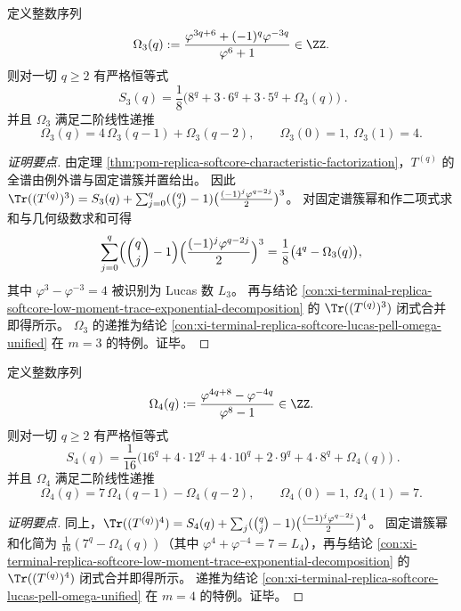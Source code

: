 \begin{conclusion}\label{con:xi-terminal-replica-softcore-exceptional-power-sum-m3}
定义整数序列
\[
\Omega_3(q):=\frac{\varphi^{3q+6}+(-1)^q\varphi^{-3q}}{\varphi^{6}+1}\in\ZZ.
\]
则对一切 \(q\ge 2\) 有严格恒等式
\[
\boxed{\;
S_3(q)=\frac18\Big(8^{q}+3\cdot 6^{q}+3\cdot 5^{q}+\Omega_3(q)\Big)\; }.
\]
并且 \(\Omega_3\) 满足二阶线性递推
\[
\Omega_3(q)=4\,\Omega_3(q-1)+\Omega_3(q-2),\qquad \Omega_3(0)=1,\ \Omega_3(1)=4.
\]
\end{conclusion}
\begin{proof}[证明要点]
由定理 \ref{thm:pom-replica-softcore-characteristic-factorization}，\(T^{(q)}\) 的全谱由例外谱与固定谱簇并置给出。
因此
\(
\Tr((T^{(q)})^3)=S_3(q)+\sum_{j=0}^{q}(\binom{q}{j}-1)\bigl(\frac{(-1)^j\varphi^{q-2j}}{2}\bigr)^3
\)。
对固定谱簇幂和作二项式求和与几何级数求和可得
\[
\sum_{j=0}^{q}\Bigl(\binom{q}{j}-1\Bigr)\Bigl(\frac{(-1)^j\varphi^{q-2j}}{2}\Bigr)^3
=\frac18\bigl(4^q-\Omega_3(q)\bigr),
\]
其中 \(\varphi^3-\varphi^{-3}=4\) 被识别为 Lucas 数 \(L_3\)。
再与结论 \ref{con:xi-terminal-replica-softcore-low-moment-trace-exponential-decomposition} 的 \(\Tr((T^{(q)})^3)\) 闭式合并即得所示。
\(\Omega_3\) 的递推为结论 \ref{con:xi-terminal-replica-softcore-lucas-pell-omega-unified} 在 \(m=3\) 的特例。证毕。
\end{proof}

\begin{conclusion}\label{con:xi-terminal-replica-softcore-exceptional-power-sum-m4}
定义整数序列
\[
\Omega_4(q):=\frac{\varphi^{4q+8}-\varphi^{-4q}}{\varphi^{8}-1}\in\ZZ.
\]
则对一切 \(q\ge 2\) 有严格恒等式
\[
\boxed{\;
S_4(q)=\frac1{16}\Big(16^{q}+4\cdot 12^{q}+4\cdot 10^{q}+2\cdot 9^{q}+4\cdot 8^{q}+\Omega_4(q)\Big)\; }.
\]
并且 \(\Omega_4\) 满足二阶线性递推
\[
\Omega_4(q)=7\,\Omega_4(q-1)-\Omega_4(q-2),\qquad \Omega_4(0)=1,\ \Omega_4(1)=7.
\]
\end{conclusion}
\begin{proof}[证明要点]
同上，\(
\Tr((T^{(q)})^4)=S_4(q)+\sum_{j}(\binom{q}{j}-1)\bigl(\frac{(-1)^j\varphi^{q-2j}}{2}\bigr)^4
\)。
固定谱簇幂和化简为 \(\frac1{16}(7^q-\Omega_4(q))\)（其中 \(\varphi^4+\varphi^{-4}=7=L_4\)），再与结论 \ref{con:xi-terminal-replica-softcore-low-moment-trace-exponential-decomposition} 的 \(\Tr((T^{(q)})^4)\) 闭式合并即得所示。
递推为结论 \ref{con:xi-terminal-replica-softcore-lucas-pell-omega-unified} 在 \(m=4\) 的特例。证毕。
\end{proof}

